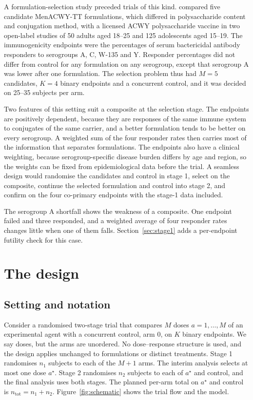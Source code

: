 A formulation-selection study preceded trials of this kind. \citet{ostergaard2009} compared five candidate MenACWY-TT formulations, which differed in polysaccharide content and conjugation method, with a licensed ACWY polysaccharide vaccine in two open-label studies of 50 adults aged 18--25 and 125 adolescents aged 15--19. The immunogenicity endpoints were the percentages of serum bactericidal antibody responders to serogroups A, C, W-135 and Y. Responder percentages did not differ from control for any formulation on any serogroup, except that serogroup A was lower after one formulation. The selection problem thus had $M=5$ candidates, $K=4$ binary endpoints and a concurrent control, and it was decided on 25--35 subjects per arm.

Two features of this setting suit a composite at the selection stage. The endpoints are positively dependent, because they are responses of the same immune system to conjugates of the same carrier, and a better formulation tends to be better on every serogroup. A weighted sum of the four responder rates then carries most of the information that separates formulations. The endpoints also have a clinical weighting, because serogroup-specific disease burden differs by age and region, so the weights can be fixed from epidemiological data before the trial. A seamless design would randomise the candidates and control in stage 1, select on the composite, continue the selected formulation and control into stage 2, and confirm on the four co-primary endpoints with the stage-1 data included.

The serogroup A shortfall shows the weakness of a composite. One endpoint failed and three responded, and a weighted average of four responder rates changes little when one of them falls. Section~\ref{sec:stage1} adds a per-endpoint futility check for this case.

\section{The design}\label{sec:design}

\subsection{Setting and notation}

Consider a randomised two-stage trial that compares $M$ doses $a=1,\dots,M$ of an experimental agent with a concurrent control, arm $0$, on $K$ binary endpoints. We say doses, but the arms are unordered. No dose--response structure is used, and the design applies unchanged to formulations or distinct treatments. Stage 1 randomises $n_1$ subjects to each of the $M+1$ arms. The interim analysis selects at most one dose $a^\star$. Stage 2 randomises $n_2$ subjects to each of $a^\star$ and control, and the final analysis uses both stages. The planned per-arm total on $a^\star$ and control is $n_{\mathrm{tot}}=n_1+n_2$. Figure~\ref{fig:schematic} shows the trial flow and the model.

